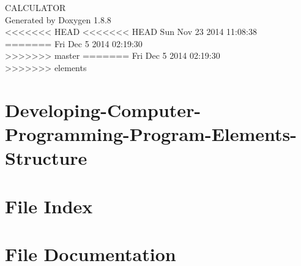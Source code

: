 \documentclass[twoside]{book}
\newcommand{\+}{\discretionary{\mbox{\scriptsize$\hookleftarrow$}}{}{}}
\newcommand{\clearemptydoublepage}{%
  \newpage{\pagestyle{empty}\cleardoublepage}%
}
\begin{document}
\hypersetup{pageanchor=false,
             bookmarks=true,
             bookmarksnumbered=true,
             pdfencoding=unicode
            }
\begin{titlepage}
\vspace*{7cm}
\begin{center}%
{\Large C\+A\+L\+C\+U\+L\+A\+T\+O\+R }\\
\vspace*{1cm}
{\large Generated by Doxygen 1.8.8}\\
\vspace*{0.5cm}
<<<<<<< HEAD
<<<<<<< HEAD
{\small Sun Nov 23 2014 11:08:38}\\
=======
{\small Fri Dec 5 2014 02:19:30}\\
>>>>>>> master
=======
{\small Fri Dec 5 2014 02:19:30}\\
>>>>>>> elements
\end{center}
\end{titlepage}
\clearemptydoublepage
\tableofcontents
\clearemptydoublepage
{}
\hypersetup{pageanchor=true}

\chapter{Developing-\/\+Computer-\/\+Programming-\/\+Program-\/\+Elements-\/\+Structure}
\label{md__developing_programming__developing_computer_programming__r_e_a_d_m_e}
\hypertarget{md__developing_programming__developing_computer_programming__r_e_a_d_m_e}{}

\chapter{File Index}

\chapter{File Documentation}



\newpage
{}
{}
\printindex
\end{document}
